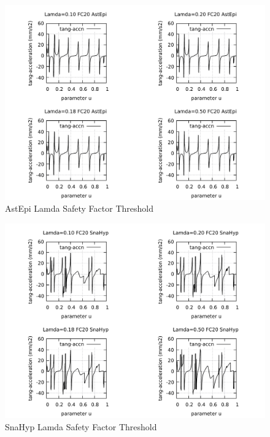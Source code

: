 \clearpage
\pagebreak
\begin{landscape}
	\begin{figure}
		\centering
		\caption  {AstEpi Lamda Safety Factor Threshold}
		\label{img-AstEpi Lamda Safety Factor Threshold}
		\includegraphics[width=1.30\textwidth]{Chap4/Lamda/img-4plots-ASTEPI-Lamda-010-018-020-050-FC20-Tang-Accn.pdf} 
	\end{figure}
\end{landscape}

\clearpage
\pagebreak
\begin{landscape}
	\begin{figure}
		\centering
		\caption  {SnaHyp Lamda Safety Factor Threshold}
		\label{img-SnaHyp Lamda Safety Factor Threshold}
		\includegraphics[width=1.30\textwidth]{Chap4/Lamda/img-4plots-SNAHYP-Lamda-010-018-020-050-FC20-Tang-Accn.pdf} 
	\end{figure}
\end{landscape}




